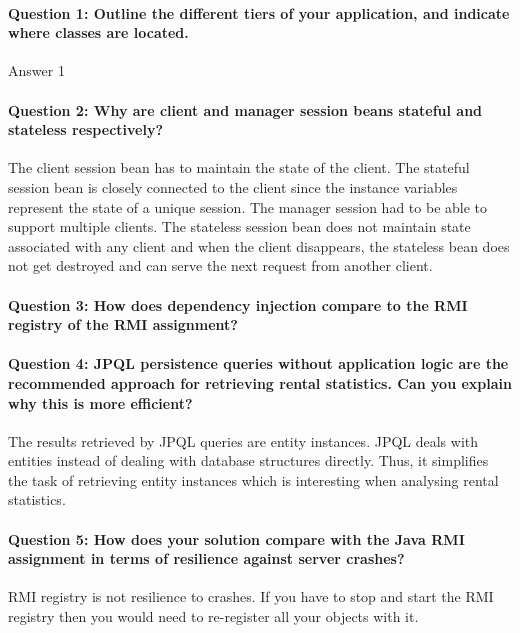 \documentclass{ds-report}
\begin{document}
	\maketitle

	\paragraph{Question 1: Outline the different tiers of your application, and indicate where classes are located.\\} 
	Answer 1
	
	\paragraph{Question 2: Why are client and manager session beans stateful and stateless respectively?\\} 
	The client session bean has to maintain the state of the client. The stateful session bean is closely connected to the client since the instance variables represent the state of a unique session. 
	The manager session had to be able to support multiple clients. 
	The stateless session bean does not maintain state associated with any client and when the client disappears, the stateless bean does not get destroyed and can serve the next request from another client.
	\paragraph{Question 3: How does dependency injection compare to the RMI registry of the RMI assignment?\\} 
	
	\paragraph{Question 4: JPQL persistence queries without application logic are the recommended approach for retrieving rental statistics. Can you explain why this is more efficient?\\} 
	The results retrieved by JPQL queries are entity instances. JPQL deals with entities instead of dealing with database structures directly. Thus, it simplifies the task of retrieving entity instances which is interesting when analysing rental statistics.
	
	\paragraph{Question 5: How does your solution compare with the Java RMI assignment in terms of resilience against server crashes?\\} 
	RMI registry is not resilience to crashes. If you have to stop and start the RMI registry then you would need to re-register all your objects with it.
	
\end{document}
